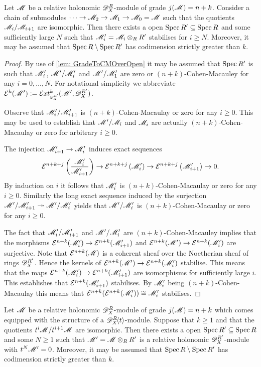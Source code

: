 \begin{lemma}\label{lem: StabilisationChains}
  Let $\mathscr{M}$ be a relative holonomic $\mathscr{D}_X^R$-module of grade $j(\mathscr{M}) = n+k$.
  Consider a chain of submodules $\cdots \to \mathscr{M}_2\to \mathscr{M}_1 \to \mathscr{M}_0 = \mathscr{M} $
  such that the quotients $\mathscr{M}_i/\mathscr{M}_{i+1}$ are isomorphic.
  Then there exists a open $\operatorname{Spec} R' \subseteq \operatorname{Spec} R$ and some sufficiently large $N$ such that $\mathscr{M}_i' = \mathscr{M}_i\otimes_R R'$ stabilises for $i\geq N$. Moreover, it may be assumed that $\operatorname{Spec} R \setminus \operatorname{Spec} R'$ has codimension strictly greater than $k$.
\end{lemma}
\begin{proof}
  By use of \cref{lem: GradeToCMOverOpen} it may be assumed that $\operatorname{Spec} R'$ is such that $\mathscr{M}_i'$, $\mathscr{M}'/\mathscr{M}_i'$ and $\mathscr{M}'/\mathscr{M}_1'$ are zero or $(n+k)$-Cohen-Macauley for any $i=0,\ldots,N$.
  For notational simplicity we abbreviate $\E^{k}(\M') :=\Ex{\D_X^{R'}}{k}(\M',\D_X^{R'})$.

  Observe that $ \mathscr{M}_i'/\mathscr{M}_{i+1}'$ is $(n+k)$-Cohen-Macaulay or zero for any $i\geq 0$.
  This may be used to establish that $\mathscr{M}'/\mathscr{M}_i$ and $\mathscr{M}_i$ are actually $(n+k)$-Cohen-Macaulay or zero for arbitrary $i\geq 0$.

  The injection $ \mathscr{M}_{i+1}'\to \mathscr{M}_i'$ induces exact sequences
  $$\mathcal{E}^{n+k+j}\left(\frac{\mathscr{M}_i'}{ \mathscr{M}_{i+1}'}\right) \to  \mathcal{E}^{n+k+j}\left(\mathscr{M}_i'\right) \to \mathcal{E}^{n+k +j}\left( \mathscr{M}_{i+1}'\right)\to 0.$$
  By induction on $i$ it follows that $\mathscr{M}_i'$ is $(n+k)$-Cohen-Macaulay or zero for any $i\geq 0$.
  Similarly the long exact sequence induced by the surjection $\mathscr{M}'/\mathscr{M}_{i+1}' \twoheadrightarrow \mathscr{M}'/\mathscr{M}_i'$ yields that $\mathscr{M}'/\mathscr{M}_i'$ is $(n+k)$-Cohen-Macaulay or zero for any $i\geq 0$.


  The fact that $\mathscr{M}_i'/\mathscr{M}_{i+1}'$ and $\mathscr{M}'/\mathscr{M}_{i}'$ are $(n+k)$-Cohen-Macauley implies that the morphisms $\mathcal{E}^{n+k}(\mathscr{M}_i') \to  \mathcal{E}^{n+k}(\mathscr{M}_{i+1}')$ and $\mathcal{E}^{n+k}(\mathscr{M}') \to \mathcal{E}^{n+k} (\mathscr{M}_i')$ are surjective.
  Note that $\mathcal{E}^{n+k}(\mathscr{M})$ is a coherent sheaf over the Noetherian sheaf of rings $\mathscr{D}_X^{R'}$.
  Hence the kernels of $\mathcal{E}^{n+k}(\mathscr{M}') \to \mathcal{E}^{n+k} (\mathscr{M}_i')$ stabilise.
  This means that the maps $\mathcal{E}^{n+k}(\mathscr{M}_i') \to  \mathcal{E}^{n+k}(\mathscr{M}_{i+1}')$ are isomorphisms for sufficiently large $i$.
  This establishes that $\mathcal{E}^{n+k}(\mathscr{M}_{i+1}')$ stabilises.
  By $ \mathscr{M}_i'$ being $(n+k)$-Cohen-Macaulay this means that $\mathcal{E}^{n+k}(\mathcal{E}^{n+k}(\mathscr{M}_i')) \cong \mathscr{M}_i'$ stabilises.
\end{proof}
\begin{lemma}\label{lem: StabilisationtN}
  Let $\mathscr{M}$ be a relative holonomic $\mathscr{D}_X^R$-module of grade $j(\mathscr{M}) = n+k$ which comes equipped with the structure of a $\mathscr{D}_X^R\mkern-5mu\left\langle t \right\rangle$-module. Suppose that $k\geq 1$ and that the quotients $t^i\mathscr{M}/ t^{i+1}\mathscr{M}$ are isomorphic.
  Then there exists a open $\operatorname{Spec} R' \subseteq \operatorname{Spec} R$ and some $N\geq 1$ such that $\mathscr{M}' = \mathscr{M} \otimes_{R} R'$ is a relative holonomic $\mathscr{D}_X^{R'}$-module with $t^N \mathscr{M}' = 0$.
  Moreover, it may be assumed that $\operatorname{Spec} R \setminus \operatorname{Spec} R'$ has codimension strictly greater than $k$.
\end{lemma}
